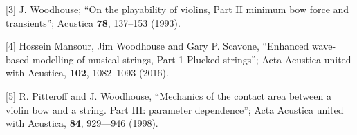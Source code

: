   [3] J. Woodhouse; “On the playability of violins, Part II minimum bow force 
  and transients”; Acustica \textbf{78}, 137–153 (1993). 

  [4] Hossein Mansour, Jim Woodhouse and Gary P. Scavone, “Enhanced wave-based 
  modelling of musical strings, Part 1 Plucked strings”; Acta Acustica united 
  with Acustica, \textbf{102}, 1082–1093 (2016). 

  [5] R. Pitteroff and J. Woodhouse, “Mechanics of the contact area between a 
  violin bow and a string. Part III: parameter dependence”; Acta Acustica 
  united with Acustica, \textbf{84}, 929—946 (1998). 